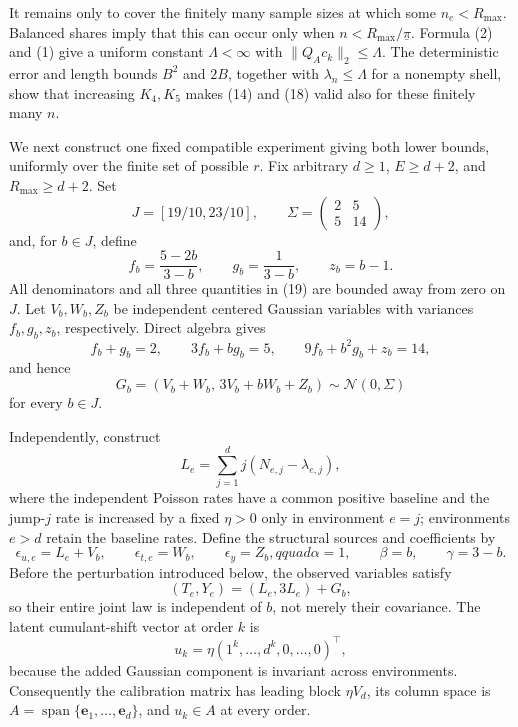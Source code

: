 It remains only to cover the finitely many sample sizes at which some \(n_e<R_{\max}\).  Balanced shares imply that this can occur only when \(n<R_{\max}/\underline\pi\).  Formula (2) and (1) give a uniform constant \(\Lambda<\infty\) with \(\|Q_Ac_k\|_2\leq\Lambda\).  The deterministic error and length bounds \(B^2\) and \(2B\), together with \(\lambda_n\leq\Lambda\) for a nonempty shell, show that increasing \(K_4,K_5\) makes (14) and (18) valid also for these finitely many \(n\).

We next construct one fixed compatible experiment giving both lower bounds, uniformly over the finite set of possible \(r\).  Fix arbitrary \(d\geq1\), \(E\geq d+2\), and \(R_{\max}\geq d+2\).  Set
\[
 J=[19/10,23/10],\qquad
 \Sigma=\begin{pmatrix}2&5\\5&14\end{pmatrix},
\]
and, for \(b\in J\), define
\[
 f_b=\frac{5-2b}{3-b},\qquad
 g_b=\frac{1}{3-b},\qquad z_b=b-1. \tag{19}
\]
All denominators and all three quantities in (19) are bounded away from zero on \(J\).  Let \(V_b,W_b,Z_b\) be independent centered Gaussian variables with variances \(f_b,g_b,z_b\), respectively.  Direct algebra gives
\[
 f_b+g_b=2,\qquad 3f_b+bg_b=5,\qquad
 9f_b+b^2g_b+z_b=14, \tag{20}
\]
and hence
\[
 G_b=(V_b+W_b,\,3V_b+bW_b+Z_b)\sim\mathcal N(0,\Sigma) \tag{21}
\]
for every \(b\in J\).

Independently, construct
\[
 L_e=\sum_{j=1}^d j(N_{e,j}-\lambda_{e,j}),
\]
where the independent Poisson rates have a common positive baseline and the jump-\(j\) rate is increased by a fixed \(\eta>0\) only in environment \(e=j\); environments \(e>d\) retain the baseline rates.  Define the structural sources and coefficients by
\[
 \epsilon_{u,e}=L_e+V_b,\qquad
 \epsilon_{t,e}=W_b,\qquad
 \epsilon_y=Z_b,qquad
 \alpha=1,\qquad \beta=b,\qquad \gamma=3-b. \tag{22}
\]
Before the perturbation introduced below, the observed variables satisfy
\[
 (T_e,Y_e)=(L_e,3L_e)+G_b, \tag{23}
\]
so their entire joint law is independent of \(b\), not merely their covariance.  The latent cumulant-shift vector at order \(k\) is
\[
 u_k=\eta(1^k,\ldots,d^k,0,\ldots,0)^\top,
\]
because the added Gaussian component is invariant across environments.  Consequently the calibration matrix has leading block \(\eta V_d\), its column space is
\(A=\operatorname{span}\{\mathbf e_1,\ldots,\mathbf e_d\}\), and \(u_k\in A\) at every order.


